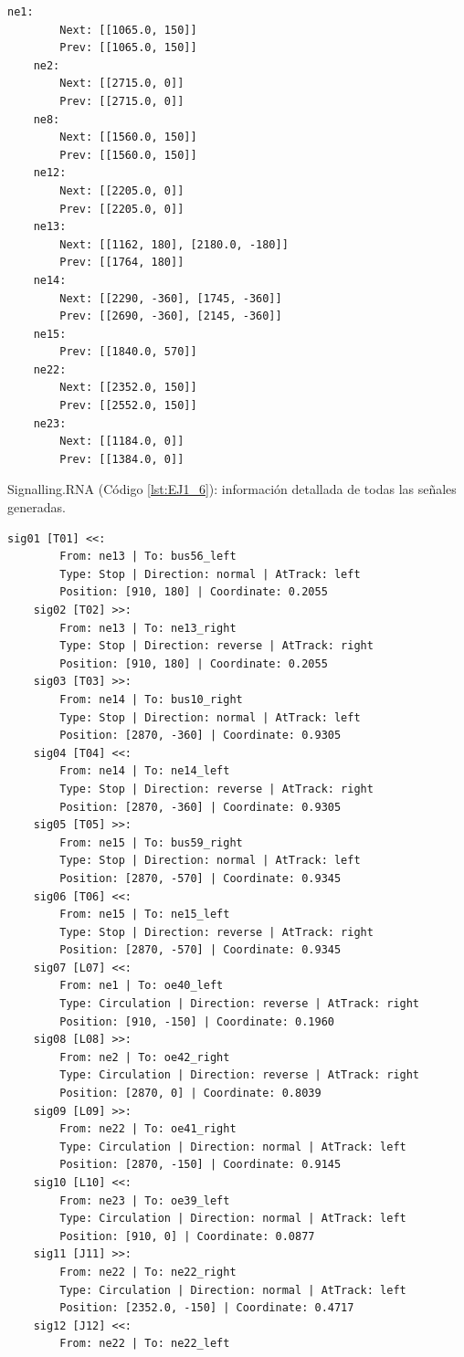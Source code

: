 	\begin{lstlisting}[language = {}, caption = SafePoints.RNA, label = {lst:EJ1_5}]
	ne1:
		Next: [[1065.0, 150]]
		Prev: [[1065.0, 150]]
	ne2:
		Next: [[2715.0, 0]]
		Prev: [[2715.0, 0]]
	ne8:
		Next: [[1560.0, 150]]
		Prev: [[1560.0, 150]]
	ne12:
		Next: [[2205.0, 0]]
		Prev: [[2205.0, 0]]
	ne13:
		Next: [[1162, 180], [2180.0, -180]]
		Prev: [[1764, 180]]
	ne14:
		Next: [[2290, -360], [1745, -360]]
		Prev: [[2690, -360], [2145, -360]]
	ne15:
		Prev: [[1840.0, 570]]
	ne22:
		Next: [[2352.0, 150]]
		Prev: [[2552.0, 150]]
	ne23:
		Next: [[1184.0, 0]]
		Prev: [[1384.0, 0]]
	\end{lstlisting}
	
	Signalling.RNA (Código \ref{lst:EJ1_6}): información detallada de todas las señales generadas.
	
	\begin{lstlisting}[language = {}, caption = Signalling.RNA, label = {lst:EJ1_6}]
	sig01 [T01] <<:
		From: ne13 | To: bus56_left
		Type: Stop | Direction: normal | AtTrack: left 
		Position: [910, 180] | Coordinate: 0.2055
	sig02 [T02] >>:
		From: ne13 | To: ne13_right
		Type: Stop | Direction: reverse | AtTrack: right 
		Position: [910, 180] | Coordinate: 0.2055
	sig03 [T03] >>:
		From: ne14 | To: bus10_right
		Type: Stop | Direction: normal | AtTrack: left 
		Position: [2870, -360] | Coordinate: 0.9305
	sig04 [T04] <<:
		From: ne14 | To: ne14_left
		Type: Stop | Direction: reverse | AtTrack: right 
		Position: [2870, -360] | Coordinate: 0.9305
	sig05 [T05] >>:
		From: ne15 | To: bus59_right
		Type: Stop | Direction: normal | AtTrack: left 
		Position: [2870, -570] | Coordinate: 0.9345
	sig06 [T06] <<:
		From: ne15 | To: ne15_left
		Type: Stop | Direction: reverse | AtTrack: right 
		Position: [2870, -570] | Coordinate: 0.9345
	sig07 [L07] <<:
		From: ne1 | To: oe40_left
		Type: Circulation | Direction: reverse | AtTrack: right 
		Position: [910, -150] | Coordinate: 0.1960
	sig08 [L08] >>:
		From: ne2 | To: oe42_right
		Type: Circulation | Direction: reverse | AtTrack: right 
		Position: [2870, 0] | Coordinate: 0.8039
	sig09 [L09] >>:
		From: ne22 | To: oe41_right
		Type: Circulation | Direction: normal | AtTrack: left 
		Position: [2870, -150] | Coordinate: 0.9145
	sig10 [L10] <<:
		From: ne23 | To: oe39_left
		Type: Circulation | Direction: normal | AtTrack: left 
		Position: [910, 0] | Coordinate: 0.0877
	sig11 [J11] >>:
		From: ne22 | To: ne22_right
		Type: Circulation | Direction: normal | AtTrack: left 
		Position: [2352.0, -150] | Coordinate: 0.4717
	sig12 [J12] <<:
		From: ne22 | To: ne22_left

\end{lstlisting}

